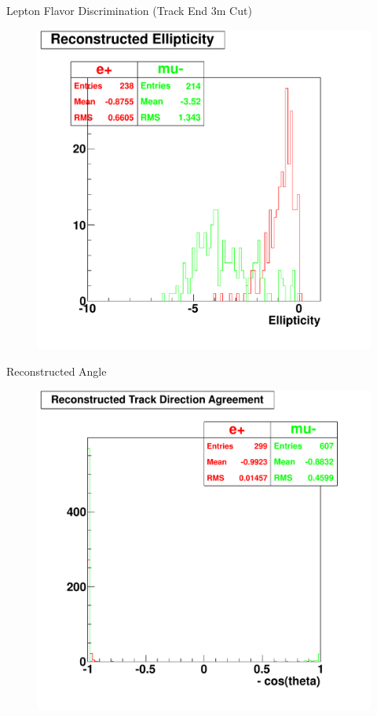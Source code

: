 \documentclass{beamer} %
\begin{document}
\begin{frame}{Lepton Flavor Discrimination (Track End 3m  Cut)}
	\begin{figure}
		\includegraphics[width=\textwidth,height=0.9\textheight,keepaspectratio]
			{material/emu_mtq_recon_ellipticity-3Mcut.pdf}
	\end{figure}
\end{frame}

\begin{frame}{Reconstructed Angle}
	\begin{figure}
		\includegraphics[width=\textwidth,height=0.9\textheight,keepaspectratio]
			{material/emu_mtq_recon_track_dir_agreement.pdf}
	\end{figure}
\end{frame}
\end{document}
